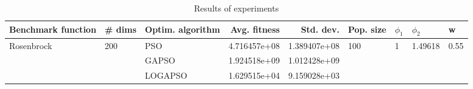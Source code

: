 \begin{table}
\centering
\caption{Results of experiments}
\begin{tabular}{lllrrllll}
\toprule
         Benchmark function &              \# dims & Optim. algorithm &  Avg. fitness &    Std. dev. &            Pop. size &         $\phi_{1}$ &               $\phi_{2}$ &                     w \\
\midrule
\multirow{3}{*}{Rosenbrock} & \multirow{3}{*}{200} &              PSO &  4.716457e+08 & 1.389407e+08 & \multirow{3}{*}{100} & \multirow{3}{*}{1} & \multirow{3}{*}{1.49618} & \multirow{3}{*}{0.55} \\
                            &                      &            GAPSO &  1.924518e+09 & 1.012428e+09 &                      &                    &                          &                       \\
                            &                      &          LOGAPSO &  1.629515e+04 & 9.159028e+03 &                      &                    &                          &                       \\
\bottomrule
\end{tabular}
\end{table}

